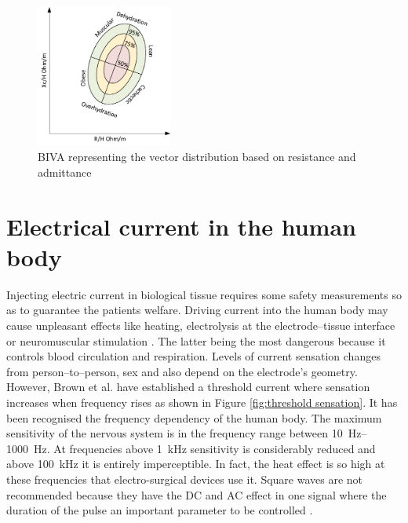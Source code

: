 \begin{figure}[!htpb]
	\centering
	\includegraphics[width=0.4\textwidth,keepaspectratio]{figure13}    
	\caption[BIVA representation]{BIVA representing the vector distribution based on resistance and admittance}
	\label{fig:BIVA plot}
\end{figure}


\section{Electrical current in the human body} %
\label{section impedance 8}
Injecting electric current in biological tissue requires some safety measurements so as to guarantee the patients welfare. Driving current into the human body may cause unpleasant effects like heating, electrolysis at the electrode–tissue interface or neuromuscular stimulation \cite{bertemes2002tissue, martinsen2011bioimpedance}. The latter being the most dangerous because it controls blood circulation and respiration. Levels of current sensation changes from person–to–person, sex and also depend on the electrode’s geometry. However, Brown et al. \cite{brown1998medical} have established a threshold current where sensation increases when frequency rises as shown in Figure \ref{fig:threshold sensation}.  It has been recognised the frequency dependency of the human body. The maximum sensitivity of the nervous system is in the frequency range between \SIrange[scientific-notation = engineering]{10}{1000}{\hertz}. At frequencies above \SI{1}{\kilo\hertz} sensitivity is considerably reduced and above \SI{100}{\kilo\hertz} it is entirely imperceptible. In fact, the heat effect is so high at these frequencies that electro-surgical devices use it. Square waves are not recommended because they have the DC and AC effect in one signal where the duration of the pulse an important parameter to be controlled \cite{martinsen2011bioimpedance}.

